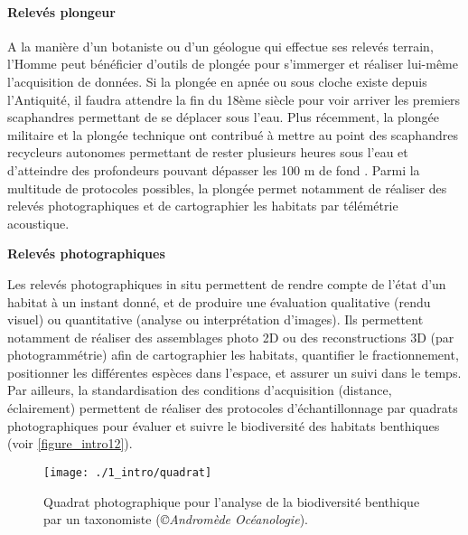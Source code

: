 \paragraph{Relevés plongeur}

A la manière d’un botaniste ou d’un géologue qui effectue ses relevés terrain, l’Homme peut bénéficier d’outils de plongée pour s’immerger et réaliser lui-même l’acquisition de données. Si la plongée en apnée ou sous cloche existe depuis l’Antiquité, il faudra attendre la fin du 18ème siècle pour voir arriver les premiers scaphandres permettant de se déplacer sous l’eau. Plus récemment, la plongée militaire et la plongée technique ont contribué à mettre au point des scaphandres recycleurs autonomes permettant de rester plusieurs heures sous l’eau et d’atteindre des profondeurs pouvant dépasser les 100 m de fond \citep{sieber_review_2010}. Parmi la multitude de protocoles possibles, la plongée permet notamment de réaliser des relevés photographiques et de cartographier les habitats par télémétrie acoustique.

\noindent\textbf{Relevés photographiques}

Les relevés photographiques in situ permettent de rendre compte de l’état d’un habitat à un instant donné, et de produire une évaluation qualitative (rendu visuel) ou quantitative (analyse ou interprétation d’images). Ils permettent notamment de réaliser des assemblages photo 2D ou des reconstructions 3D (par photogrammétrie) afin de cartographier les habitats, quantifier le fractionnement, positionner les différentes espèces dans l’espace, et assurer un suivi dans le temps. Par ailleurs, la standardisation des conditions d’acquisition (distance, éclairement) permettent de réaliser des protocoles d’échantillonnage par quadrats photographiques pour évaluer et suivre le biodiversité des habitats benthiques \citep{deter_rapid_2012} (voir \autoref{figure_intro12}).

\begin{figure}[H]
	\begin{center}
	\texttt{[image: ./1\_intro/quadrat]}
		\caption[Quadrat photographique pour l’analyse de la biodiversité benthique par un taxonomiste]{Quadrat photographique pour l’analyse de la biodiversité benthique par un taxonomiste (\textit{©Andromède Océanologie}).}
	\label{figure_intro12}
\end{center}
\end{figure}

